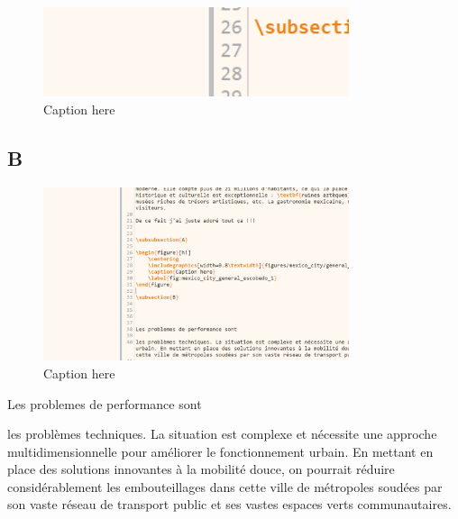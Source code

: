 \documentclass[12pt, a4paper]{article}
\begin{document}
\begin{figure}[h!]
    \centering
    \includegraphics[width=0.8\textwidth]{figures/mexico_city/general_escobedo/a/fig_1.png}
    \caption{Caption here}
    \label{fig:mexico_city_general_escobedo_1}
\end{figure}

\subsection{B}


\begin{figure}[h!]
    \centering
    \includegraphics[width=0.8\textwidth]{figures/mexico_city/b/default/fig_1.png}
    \caption{Caption here}
    \label{fig:mexico_city_b_1}
\end{figure}




Les problemes de performance sont 

les problèmes techniques. La situation est complexe et nécessite une approche multidimensionnelle pour améliorer le fonctionnement urbain. En mettant en place des solutions innovantes à la mobilité douce, on pourrait réduire considérablement les embouteillages dans cette ville de métropoles soudées par son vaste réseau de transport public et ses vastes espaces verts communautaires.
\end{document}

